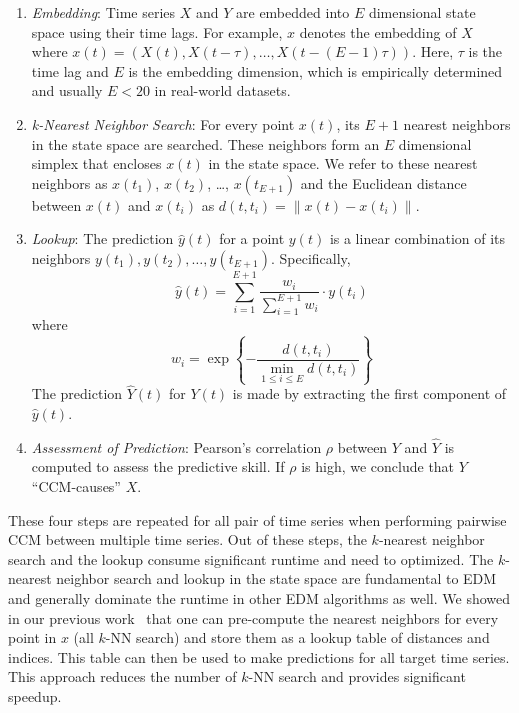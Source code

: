 \documentclass[sigconf]{acmart}
\begin{document}
\begin{enumerate}
    \item \textit{Embedding}: Time series $X$ and $Y$ are embedded into
        $E$ dimensional state space using their time lags. For example,
        $x$ denotes the embedding of $X$ where $x(t)=(X(t), X(t-\tau),
        \dots, X(t-(E-1) \tau))$. Here, $\tau$ is the time lag and $E$ is 
        the embedding dimension, which is
        empirically determined and usually $E<20$ in real-world datasets.
    \item \textit{k-Nearest Neighbor Search}: For every point $x(t)$,
         its $E+1$ nearest neighbors in the state space are searched. These
         neighbors form an $E$ dimensional simplex that encloses $x(t)$ in the
         state space. We refer to these nearest neighbors as $x(t_1)$, $x(t_2)$,
         \dots, $x(t_{E+1})$ and the Euclidean distance between $x(t)$ and
         $x(t_i)$ as $d(t, t_i) =\lVert x(t) - x(t_i)
        \rVert$.
    \item \textit{Lookup}: The prediction $\hat{y}(t)$ for a point $y(t)$ is a
        linear combination of its neighbors $y(t_1), y(t_2), \dots, y(t_{E+1})$.
        Specifically,
        \begin{equation*}
            \hat{y}(t) = \sum^{E+1}_{i=1} \frac{w_i}{\sum^{E+1}_{i=1}{w_i}} \cdot y(t_i)
        \end{equation*}
        where
        \begin{equation*}
            w_i = \exp\left\{ -\frac{d(t, t_i)}{\min\limits_{1\leq i \leq E}{d(t, t_i)}}\right\}
        \end{equation*}
        The prediction $\hat{Y}(t)$ for $Y(t)$ is made by extracting the first
        component of $\hat{y}(t)$.
    \item \textit{Assessment of Prediction}: Pearson's correlation $\rho$
        between $Y$ and $\hat{Y}$ is computed to assess the predictive skill.
        If $\rho$ is high, we conclude that $Y$ ``CCM-causes'' $X$.
\end{enumerate}

These four steps are repeated for all pair of time series when performing pairwise
CCM between multiple time series. Out of these steps, the $k$-nearest neighbor
search and the lookup consume significant runtime and need to optimized. 
The $k$-nearest neighbor search and lookup in the state space are fundamental to EDM and generally dominate the runtime in other EDM algorithms as well.
We showed in our previous work~\cite{mpedm} that one can pre-compute the nearest
neighbors for every point in $x$ (all $k$-NN search) and store them as a lookup
table of distances and indices. This table can then be used to make
predictions for all target time series. This approach reduces the number of
$k$-NN search and provides significant speedup.
\end{document}
